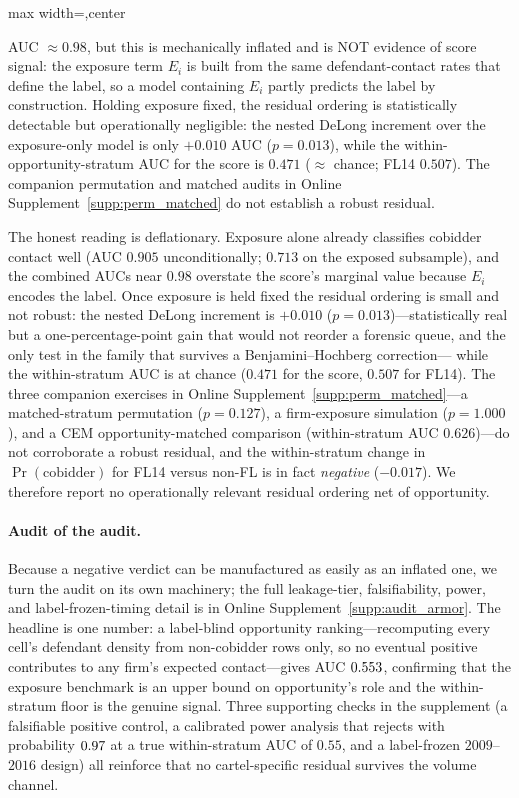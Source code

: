 \begin{table}[htbp]
\begin{adjustbox}{max width=\textwidth,center}
\begin{threeparttable}
\begin{tablenotes}
{AUC $\approx 0.98$, but this is mechanically inflated and is NOT
evidence of score signal:} the exposure term $E_i$ is built from
the same defendant-contact rates that define the label, so a
model containing $E_i$ partly predicts the label by construction.
Holding exposure fixed, the residual ordering is statistically
detectable but operationally negligible: the nested DeLong increment
over the exposure-only model is only $+0.010$ AUC ($p=0.013$), while
the within-opportunity-stratum AUC for the score is $0.471$ ($\approx$
chance; FL14 $0.507$). The companion permutation and matched audits in
Online Supplement~\ref{supp:perm_matched} do not establish a robust
residual.
\end{tablenotes}
\end{threeparttable}
\end{adjustbox}
\end{table}

The honest reading is deflationary. Exposure alone already classifies
cobidder contact well (AUC $0.905$ unconditionally; $0.713$ on the
exposed subsample), and the combined AUCs near $0.98$ overstate the
score's marginal value because $E_i$ encodes the label. Once exposure is
held fixed the residual ordering is small and not robust: the nested
DeLong increment is $+0.010$ ($p=0.013$)---statistically real but a
one-percentage-point gain that would not reorder a forensic queue, and the
only test in the family that survives a Benjamini--Hochberg correction---
while the within-stratum AUC is at chance ($0.471$ for the score, $0.507$
for FL14). The three companion exercises in Online
Supplement~\ref{supp:perm_matched}---a matched-stratum permutation
($p=0.127$), a firm-exposure simulation ($p=1.000$), and a CEM
opportunity-matched comparison (within-stratum AUC $0.626$)---do not
corroborate a robust residual, and the within-stratum change in
$\Pr(\text{cobidder})$ for FL14 versus non-FL is in fact \emph{negative}
($-0.017$). We therefore report no operationally relevant residual
ordering net of opportunity.

\paragraph{Audit of the audit.} Because a negative verdict can be
manufactured as easily as an inflated one, we turn the audit on its own
machinery; the full leakage-tier, falsifiability, power, and
label-frozen-timing detail is in Online
Supplement~\ref{supp:audit_armor}. The headline is one number: a
label-blind opportunity ranking---recomputing every cell's defendant
density from non-cobidder rows only, so no eventual positive contributes
to any firm's expected contact---gives AUC $0.553$, confirming
that the exposure benchmark is an upper bound on opportunity's role and
the within-stratum floor is the genuine signal. Three supporting checks
in the supplement (a falsifiable positive control, a calibrated power
analysis that rejects with probability $0.97$ at a true
within-stratum AUC of $0.55$, and a label-frozen $2009$--$2016$ design)
all reinforce that no cartel-specific residual survives the volume
channel.

